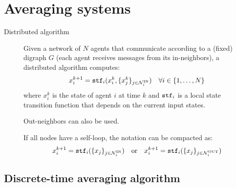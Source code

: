 \chapter{Averaging systems}


\begin{description}
    \item[Distributed algorithm] 
        Given a network of $N$ agents that communicate according to a (fixed) digraph $G$ (each agent receives messages from its in-neighbors), a distributed algorithm computes:
        \[ x_i^{k+1} = {\texttt{stf}}_i(x_i^k, \{ x_j^k \}_{j \in \mathcal{N}_i^\text{IN}}) \quad \forall i \in \{ 1, \dots, N \} \]
        where $x_i^k$ is the state of agent $i$ at time $k$ and ${\texttt{stf}}_i$ is a local state transition function that depends on the current input states.

        \begin{remark}
            Out-neighbors can also be used.
        \end{remark}

        \begin{remark}
            If all nodes have a self-loop, the notation can be compacted as:
            \[ 
            x_i^{k+1} = {\texttt{stf}}_i(\{ x_j \}_{j \in \mathcal{N}_i^\text{IN}}) 
            \quad
            \text{or}
            \quad
            x_i^{k+1} = {\texttt{stf}}_i(\{ x_j \}_{j \in \mathcal{N}_i^\text{OUT}})
            \]
        \end{remark}
\end{description}



\section{Discrete-time averaging algorithm}

